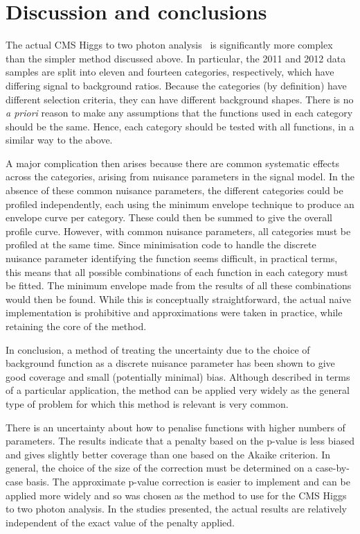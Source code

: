 \section{Discussion and conclusions} %
\label{sec:conclusions}
The actual CMS
Higgs to two photon analysis~\cite{ref:introduction:legacy}
is significantly more
complex than the simpler method discussed above. In particular, the 2011
and 2012 data
samples are split into eleven and fourteen categories, respectively, which have
differing signal to background ratios.
Because the categories (by definition) have different selection criteria,
they can have different background shapes.
There is no {\it a priori} reason to make any assumptions that the functions
used in each category should be the same. Hence, each category should be
tested with all functions, in a similar way to the above.

A major complication then arises because there are common systematic effects
across the categories, arising from nuisance parameters in the signal
model.
In the absence of these common nuisance parameters,
the different categories could be profiled independently, each using the
minimum envelope technique to produce an envelope curve per category.
These could then
be summed to give the overall profile curve. However, with common
nuisance parameters, all categories must be profiled at the same time.
Since minimisation code to handle the
discrete nuisance parameter identifying the
function seems difficult, in practical terms, this means that all possible
combinations of each function in each category must be fitted.
The minimum envelope made from the results of all these combinations would
then be found. While this is conceptually straightforward, the actual
naive implementation is prohibitive and approximations were taken in practice,
while retaining the core of the method.

In conclusion,
a method of treating the uncertainty due to the choice of background function
as a discrete nuisance parameter has been shown to give good coverage and
small (potentially minimal) bias.
Although described in terms of a particular application, the method can be
applied very widely as the general type of problem for which this method
is relevant is very common.

There is an uncertainty about how to penalise functions with higher numbers
of parameters. The results indicate that a penalty based on the p-value
is less biased and gives slightly better coverage than one based on the
Akaike criterion. In general, the choice of the size of the correction must be determined
on a case-by-case basis. The approximate p-value correction is easier to implement and
can be applied more widely and so was chosen as the method to use for the CMS Higgs to
two photon analysis.
In the studies presented, the actual results are relatively independent of the exact value of the penalty
applied.


